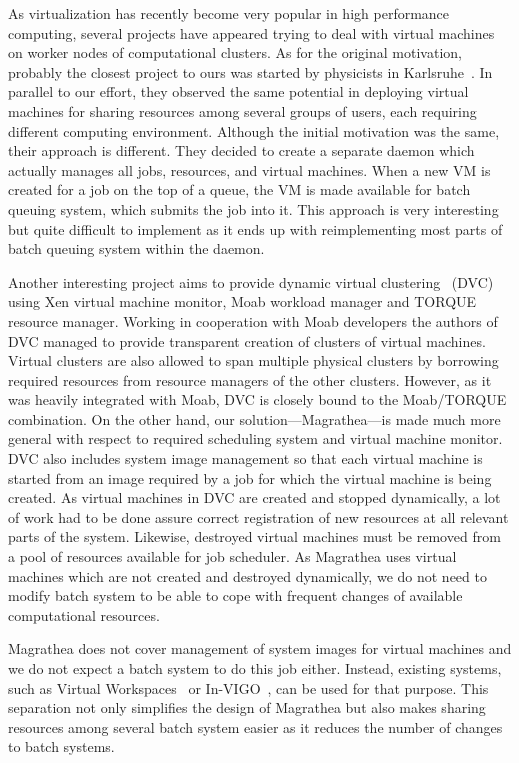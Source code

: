 \documentclass[times,10pt,twocolumn]{article}
\begin{document}
As virtualization has recently become very popular in high performance
computing, several projects have appeared trying to deal with virtual machines
on worker nodes of computational clusters. As for the original motivation,
probably the closest project to ours was started by physicists in
Karlsruhe~\cite{karlsruhe}. In parallel to our effort, they observed the same
potential in deploying virtual machines for sharing resources among several
groups of users, each requiring different computing environment. Although the
initial motivation was the same, their approach is different. They decided to
create a separate daemon which actually manages all jobs, resources, and
virtual machines. When a new VM is created for a job on the top of a queue,
the VM is made available for batch queuing system, which submits the job into
it. This approach is very interesting but quite difficult to implement as it
ends up with reimplementing most parts of batch queuing system within the
daemon.

Another interesting project aims to provide dynamic virtual
clustering~\cite{dvc} (DVC) using Xen virtual machine monitor, Moab workload
manager and TORQUE resource manager. Working in cooperation with Moab
developers the authors of DVC managed to provide transparent creation of
clusters of virtual machines. Virtual clusters are also allowed to span
multiple physical clusters by borrowing required resources from resource
managers of the other clusters. However, as it was heavily integrated with
Moab, DVC is closely bound to the Moab/TORQUE combination. On the other hand,
our solution---Magrathea---is made much more general with respect to required
scheduling system and virtual machine monitor. DVC also includes system image
management so that each virtual machine is started from an image required by a
job for which the virtual machine is being created. As virtual machines in DVC
are created and stopped dynamically, a lot of work had to be done assure
correct registration of new resources at all relevant parts of the system.
Likewise, destroyed virtual machines must be removed from a pool of resources
available for job scheduler. As Magrathea uses virtual machines which are not
created and destroyed dynamically, we do not need to modify batch system to be
able to cope with frequent changes of available computational resources.

Magrathea does not cover management of system images for virtual machines and
we do not expect a batch system to do this job either. Instead, existing
systems, such as Virtual Workspaces~\cite{workspaces} or
In-VIGO~\cite{invigo}, can be used for that purpose. This separation not only
simplifies the design of Magrathea but also makes sharing resources among
several batch system easier as it reduces the number of changes to batch
systems.
\end{document}
